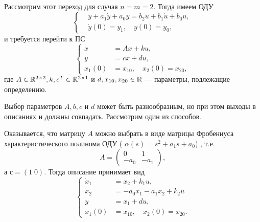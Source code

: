 \documentclass[../../TAU.tex]{subfiles}
\begin{document}
    Рассмотрим этот переход для случая $n=m=2$. Тогда имеем ОДУ
    \begin{equation}\label{ODU_2}
        \left\{
        \begin{aligned}
            &\ddot y + a_1 \dot y + a_0 y = b_2 \ddot{u} + b_1 \dot u + b_0 u,\\
            &\dot y(0) = y_1,\quad y(0) = y_0,
        \end{aligned}\right.
    \end{equation}
        и требуется перейти к ПС
    \begin{equation}\label{STDS_2}
        \left\{
        \begin{aligned}
            \dot x &= Ax + ku,\\
            y &= cx + du,\\
            x_1(0) &= x_{10},\quad x_2(0) = x_{20},
        \end{aligned}
        \right.
    \end{equation}
    где 
    $A\in\mathbb{R}^{2\times2}, k, c^T\in\mathbb{R}^{2\times1}$ 
    и 
    $d,x_{10}, x_{20}\in\mathbb{R}$ --- 
    параметры, подлежащие определению.

    Выбор параметров $A,b,c$ и $d$ может быть разнообразным, но при этом выходы в описаниях  и  должны совпадать. Рассмотрим один из способов.

    Оказывается, что матрицу $A$ можно выбрать в виде матрицы Фробениуса характеристического полинома ОДУ  (
    $\alpha(s) = s^2+a_1s+a_0$) , 
    т.е.
    $$
        A =
        \begin{pmatrix}
            0&    1\\
            -a_0& -a_1
        \end{pmatrix},
    $$
    а $с = (1\; 0)$. Тогда описание  принимает вид
    \begin{equation}\label{EQ1}
        \left\{
        \begin{aligned}
            \dot x_1 &= x_2 + k_1 u,\\
            \dot x_2 &= -a_0x_1-a_1x_2+k_2u\\
            y &= x_1 + du,\\
            x_1(0) &= x_{10},\quad x_2(0) = x_{20}.
        \end{aligned}
        \right.
    \end{equation}
\end{document}
